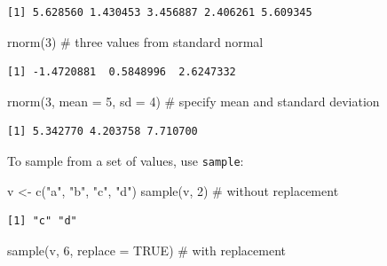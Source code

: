 \documentclass[
  letterpaper,
  DIV=11,
  numbers=noendperiod]{scrreprt}
\newenvironment{Shaded}{\begin{snugshade}}{\end{snugshade}}
\newcommand{\AttributeTok}[1]{\textcolor[rgb]{0.40,0.45,0.13}{#1}}
\newcommand{\CommentTok}[1]{\textcolor[rgb]{0.37,0.37,0.37}{#1}}
\newcommand{\ConstantTok}[1]{\textcolor[rgb]{0.56,0.35,0.01}{#1}}
\newcommand{\DecValTok}[1]{\textcolor[rgb]{0.68,0.00,0.00}{#1}}
\newcommand{\FunctionTok}[1]{\textcolor[rgb]{0.28,0.35,0.67}{#1}}
\newcommand{\NormalTok}[1]{\textcolor[rgb]{0.00,0.23,0.31}{#1}}
\newcommand{\OtherTok}[1]{\textcolor[rgb]{0.00,0.23,0.31}{#1}}
\newcommand{\StringTok}[1]{\textcolor[rgb]{0.13,0.47,0.30}{#1}}
\begin{document}
\begin{verbatim}
[1] 5.628560 1.430453 3.456887 2.406261 5.609345
\end{verbatim}

\begin{Shaded}
\begin{Highlighting}[]
\FunctionTok{rnorm}\NormalTok{(}\DecValTok{3}\NormalTok{) }\CommentTok{\# three values from standard normal}
\end{Highlighting}
\end{Shaded}

\begin{verbatim}
[1] -1.4720881  0.5848996  2.6247332
\end{verbatim}

\begin{Shaded}
\begin{Highlighting}[]
\FunctionTok{rnorm}\NormalTok{(}\DecValTok{3}\NormalTok{, }\AttributeTok{mean =} \DecValTok{5}\NormalTok{, }\AttributeTok{sd =} \DecValTok{4}\NormalTok{) }\CommentTok{\# specify mean and standard deviation}
\end{Highlighting}
\end{Shaded}

\begin{verbatim}
[1] 5.342770 4.203758 7.710700
\end{verbatim}

To sample from a set of values, use \texttt{sample}:

\begin{Shaded}
\begin{Highlighting}[]
\NormalTok{v }\OtherTok{\textless{}{-}} \FunctionTok{c}\NormalTok{(}\StringTok{"a"}\NormalTok{, }\StringTok{"b"}\NormalTok{, }\StringTok{"c"}\NormalTok{, }\StringTok{"d"}\NormalTok{)}
\FunctionTok{sample}\NormalTok{(v, }\DecValTok{2}\NormalTok{) }\CommentTok{\# without replacement}
\end{Highlighting}
\end{Shaded}

\begin{verbatim}
[1] "c" "d"
\end{verbatim}

\begin{Shaded}
\begin{Highlighting}[]
\FunctionTok{sample}\NormalTok{(v, }\DecValTok{6}\NormalTok{, }\AttributeTok{replace =} \ConstantTok{TRUE}\NormalTok{) }\CommentTok{\# with replacement}
\end{Highlighting}
\end{Shaded}
\end{document}
